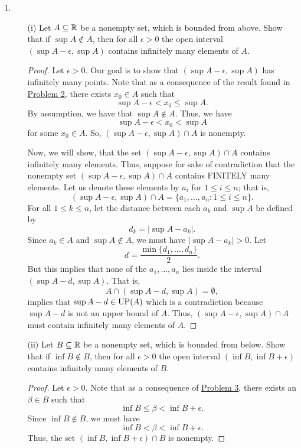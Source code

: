 \documentclass[11pt,a4paper]{article}
\begin{document}
\begin{enumerate}
\begin{proof}
\end{proof}
\item \begin{enumerate} \label{Problem 7}
    \item[(i)] Let \( A \subseteq \mathbb{R}   \) be a nonempty set, which is bounded from above. Show that if \( \sup A \notin A  \), then for all \( \epsilon > 0  \) the open interval \( (\sup A - \epsilon, \sup A ) \) contains infinitely many elements of \( A  \).
        \begin{proof}
            Let \( \epsilon > 0  \). Our goal is to show that \( (\sup A - \epsilon, \sup A ) \) has infinitely many points. Note that as a consequence of the result found in {\hyperref[Problem 2]{Problem 2}}, there exists \( {x}_{0} \in A  \) such that  
            \[  \sup A - \epsilon < {x}_{0} \leq \sup A. \]
            By assumption, we have that \( \sup A \notin A  \). Thus, we have
            \[  \sup A - \epsilon  < {x}_{0} < \sup A  \]
            for some \( {x}_{0} \in A  \). So, \( (\sup A - \epsilon, \sup A ) \cap A  \) is nonempty.

            Now, we will show, that the set \( (\sup A - \epsilon, \sup A ) \cap A  \) contains infinitely many elements. Thus, suppose for sake of contradiction that the nonempty set \( (\sup A - \epsilon , \sup A ) \cap A  \) contains FINITELY many elements. Let us denote these elements by \( {a}_{i} \) for  \( 1 \leq i \leq n  \); that is,  
        \[  (\sup A - \epsilon, \sup A ) \cap A = \{ {a}_{1}, \dots, {a}_{n}:  1 \leq i \leq n   \}. \]
        For all \( 1 \leq k \leq n  \), let the distance between each \( {a}_{k } \) and \( \sup A  \) be defined by   
            \[  {d}_{k } = | \sup A - {a}_{k} |.  \]
            Since \( {a}_{k } \in A  \) and \( \sup A \notin A  \), we must have \(  | \sup A - {a}_{k } | > 0  \). Let 
            \[  d = \frac{ \min \{ {d}_{1}, \dots, {d}_{n} \}   }{ 2  }.   \]
            But this implies that none of the \( {a}_{1}, \dots, {a}_{n} \) lies inside the interval \( (\sup A - d , \sup A ) \). That is, 
            \[  A \cap (\sup A - d , \sup A ) = \emptyset, \]
            implies that \( \sup A - d \in \operatorname{UP}(A) \) which is a contradiction because \( \sup A - d  \) is not an upper bound of \( A  \). Thus, \( (\sup A - \epsilon , \sup A ) \cap A  \) must contain infinitely many elements of \( A  \).


        \end{proof}
    \item[(ii)] Let \( B \subseteq \mathbb{R}  \) be a nonempty set, which is bounded from below. Show that if \( \inf B \notin B  \), then for all \( \epsilon > 0  \) the open interval \( (\inf B , \inf B + \epsilon ) \) contains infinitely many elements of \( B  \).
    \begin{proof}
    Let \( \epsilon > 0  \). Note that as a consequence of {\hyperref[Problem 3]{Problem 3}}, there exists an \( \beta \in B  \) such that  
    \[ \inf B   \leq  \beta < \inf B + \epsilon. \]
    Since \( \inf B \notin B  \), we must have
    \[  \inf B < \beta < \inf B + \epsilon. \]
    Thus, the set \( (\inf B, \inf B + \epsilon ) \cap B  \) is nonempty.


\end{proof}
\end{enumerate}
\end{enumerate}
\end{document}
